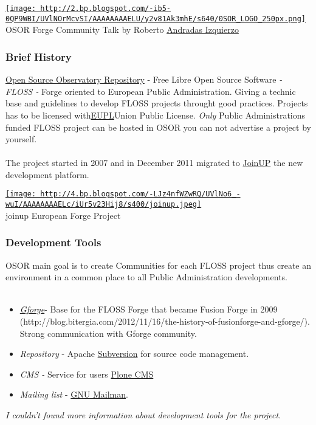 
\begin{tabular}\href{http://2.bp.blogspot.com/-ib5-0QP9WBI/UVlNOrMcvSI/AAAAAAAAELU/y2v81Ak3mhE/s1600/0SOR_LOGO_250px.png}{
\texttt{[image: http://2.bp.blogspot.com/-ib5-0QP9WBI/UVlNOrMcvSI/AAAAAAAAELU/y2v81Ak3mhE/s640/0SOR\_LOGO\_250px.png]}} \\ 
OSOR Forge Community Talk by Roberto \href{https://twitter.com/randradas}{Andradas Izquierzo}
\end{tabular}

\subsubsection{ Brief History}\href{https://joinup.ec.europa.eu/page/osor.eu}{Open Source Observatory Repository} - Free Libre Open Source Software \textit{- FLOSS -} Forge oriented to European Public Administration. Giving a technic base and guidelines to develop FLOSS projects throught good practices. Projects has to be licensed with\nolinebreak\href{http://joinup.ec.europa.eu/software/page/eupl/licence-eupl}{EUPL}\nolinebreakEuropean Union Public License. \textit{Only} Public Administrations funded FLOSS project can be hosted in OSOR you can not advertise a project by yourself.
\\
\\ The project started in 2007 and in December 2011 migrated to \href{https://joinup.ec.europa.eu/page/osor.eu}{JoinUP} the new development platform.
\\
\begin{tabular}\href{http://4.bp.blogspot.com/-LJz4nfWZwRQ/UVlNo6_-wuI/AAAAAAAAELc/iUr5v23Hij8/s1600/joinup.jpeg}{
\texttt{[image: http://4.bp.blogspot.com/-LJz4nfWZwRQ/UVlNo6\_-wuI/AAAAAAAAELc/iUr5v23Hij8/s400/joinup.jpeg]}} \\ 
joinup European Forge Project
\end{tabular}

\subsubsection{ Development Tools} OSOR main goal is to create Communities for each FLOSS project thus create an environment in a common place to all Public Administration developments.
\\
\\
\begin{itemize}
	\item \textit{\href{http://gforge.com/gf/}{Gforge}}\nolinebreak- Base for the FLOSS Forge that became Fusion Forge in 2009 (http://blog.bitergia.com/2012/11/16/the-history-of-fusionforge-and-gforge/). Strong communication with Gforge community.
	\item \textit{Repository} - Apache \href{http://subversion.apache.org/}{Subversion} for source code management.
	\item \textit{CMS -} Service for users \href{http://plone.org/}{Plone CMS}
	\item \textit{Mailing list} - \href{http://www.gnu.org/software/mailman/}{GNU Mailman}.
\end{itemize}\textit{I couldn't found more information about development tools for the project.}
\\

